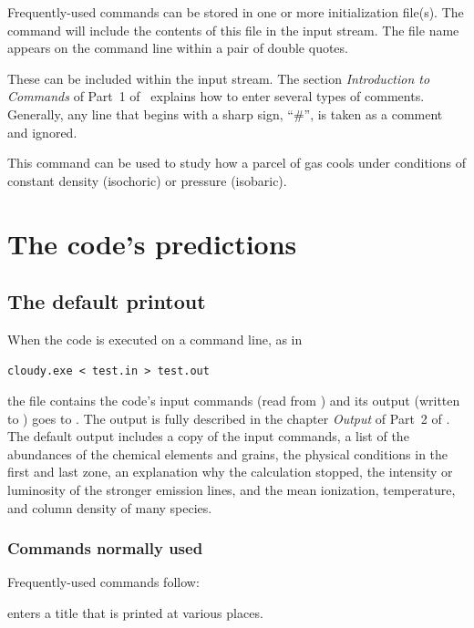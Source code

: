 \documentclass[12pt,twoside]{article}
\begin{document}
{ Frequently-used commands
can be stored in one or more initialization file(s).
The  command will include the
contents of this file in the input stream.
The file name appears on the command line within a pair of double quotes.

 These can be included
within the input stream.
The section \emph{Introduction to Commands} of Part~1
of \Hazy\ explains how to enter several types of comments.
Generally, any line that begins with a sharp sign, ``\#'',
is taken as a comment and ignored.

This command can be used to study how a parcel of gas cools
under conditions of constant density (isochoric) or pressure
(isobaric).

\section{The code's predictions}
\label{sec:TheCodesPredictions}

\subsection{The default printout}

When the code is executed on a command line, as in
\small
\begin{verbatim}
cloudy.exe < test.in > test.out
\end{verbatim}
\normalsize
the file  contains the code's
input commands (read from ) and
its output (written to ) goes
to .
The output is fully
described in the chapter \emph{Output} of Part~2 of \Hazy.
The default output
includes a copy of the input commands, a list of the abundances of the
chemical elements and grains, the physical conditions in the first and last
zone, an explanation why the calculation stopped, the intensity or luminosity
of the stronger emission lines, and the mean ionization, temperature, and
column density of many species.

\subsubsection{Commands normally used}

Frequently-used commands follow:

 enters a title that is printed at various places.

}
\end{document}
